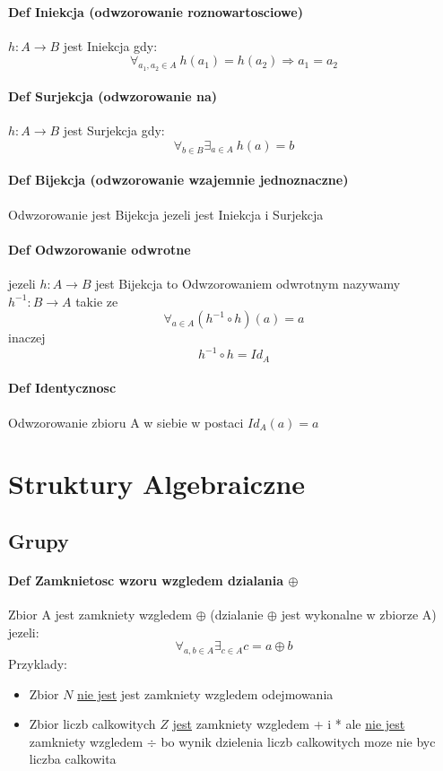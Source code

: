 \documentclass[a4paper]{article}
\begin{document}
\paragraph{Def Iniekcja (odwzorowanie roznowartosciowe)}
$ h:A \rightarrow B $ jest Iniekcja gdy:
\begin{equation}
    \forall_{a_1,a_2 \in A} \ h(a_1) = h(a_2) \Rightarrow a_1 = a_2
\end{equation}
\paragraph{Def Surjekcja (odwzorowanie na)}
$ h:A \rightarrow B $ jest Surjekcja gdy:
\begin{equation}
    \forall_{b \in B} \exists_{a \in A } \ h(a) = b
\end{equation}
\paragraph{Def Bijekcja (odwzorowanie wzajemnie jednoznaczne)}
Odwzorowanie jest Bijekcja jezeli jest Iniekcja i Surjekcja
\paragraph{Def Odwzorowanie odwrotne}
jezeli $ h:A \rightarrow B $ jest Bijekcja to Odwzorowaniem odwrotnym nazywamy $ h^{-1}:B \rightarrow A $ takie ze
\begin{equation}
\forall_{a \in A} (h^{-1} \circ h)(a) = a
\end{equation}
inaczej
\begin{equation}
    h^{-1} \circ h = Id_A
\end{equation}
\paragraph{Def Identycznosc}
Odwzorowanie zbioru A w siebie w postaci $ Id_A(a) =a $
\clearpage
%
%
\section{Struktury Algebraiczne}
\subsection{Grupy}
\paragraph{Def Zamknietosc wzoru wzgledem dzialania $ \oplus $}
Zbior A jest zamkniety wzgledem $ \oplus $ (dzialanie $\oplus$ jest wykonalne w zbiorze A) jezeli:
\begin{equation}
    \forall_{a,b \in A} \exists_{c \in A} c = a \oplus b
\end{equation}
Przyklady:
\begin{itemize}
    \item Zbior $N$  \underline{nie jest} jest zamkniety wzgledem odejmowania
    \item Zbior liczb calkowitych $Z$ \underline{jest} zamkniety wzgledem  + i * ale \underline{nie jest} zamkniety wzgledem $\div$ bo wynik dzielenia liczb calkowitych moze nie byc liczba calkowita
\end{itemize}
\end{document}
